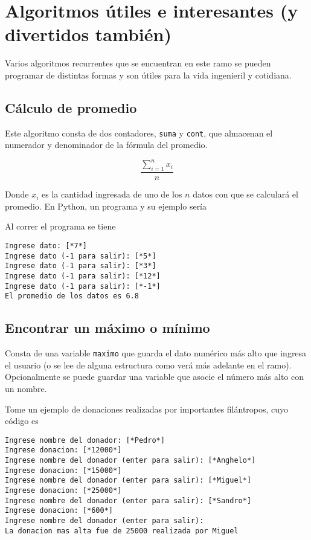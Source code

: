\section*{Algoritmos útiles e interesantes (y divertidos también)}

Varios algoritmos recurrentes que se encuentran en este ramo se pueden programar de distintas formas y son útiles para la vida ingenieril y cotidiana.

\subsection*{Cálculo de promedio}

Este algoritmo consta de dos contadores, \texttt{suma} y \texttt{cont}, que almacenan el numerador y denominador de la fórmula del promedio.

$$ \frac{\sum_{i=1}^{n} x_{i}}{n} $$

Donde $x_i$ es la cantidad ingresada de uno de los $n$ datos con que se calculará el promedio. En Python, un programa y su ejemplo sería


    
    
Al correr el programa se tiene

\begin{lstlisting}[style=consola]
Ingrese dato: [*7*]
Ingrese dato (-1 para salir): [*5*]
Ingrese dato (-1 para salir): [*3*]
Ingrese dato (-1 para salir): [*12*]
Ingrese dato (-1 para salir): [*-1*]
El promedio de los datos es 6.8
\end{lstlisting}

\subsection*{Encontrar un máximo o mínimo}

Consta de una variable \texttt{maximo} que guarda el dato numérico más alto que ingresa el usuario (o se lee de alguna estructura como verá más adelante en el ramo). Opcionalmente se puede guardar una variable que asocie el número más alto con un nombre. 

Tome un ejemplo de donaciones realizadas por importantes filántropos, cuyo código es

    

\begin{lstlisting}[style=consola]
Ingrese nombre del donador: [*Pedro*]
Ingrese donacion: [*12000*]
Ingrese nombre del donador (enter para salir): [*Anghelo*]
Ingrese donacion: [*15000*]
Ingrese nombre del donador (enter para salir): [*Miguel*]
Ingrese donacion: [*25000*]
Ingrese nombre del donador (enter para salir): [*Sandro*]
Ingrese donacion: [*600*]
Ingrese nombre del donador (enter para salir): 
La donacion mas alta fue de 25000 realizada por Miguel
\end{lstlisting}

